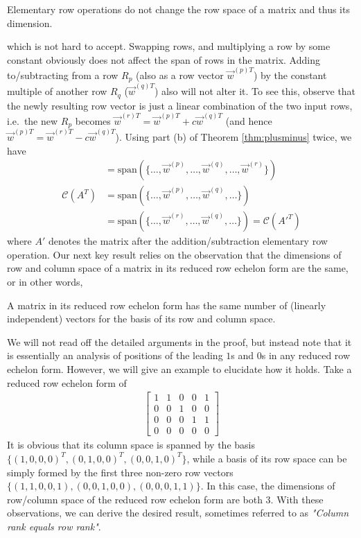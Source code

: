 \begin{proper}
\label{proper:elemrowoprowrank}
Elementary row operations do not change the row space of a matrix and thus its dimension.
\end{proper}
which is not hard to accept. Swapping rows, and multiplying a row by some constant obviously does not affect the span of rows in the matrix. Adding to/subtracting from a row $R_p$ (also as a row vector $\vec{w}^{(p)T}$) by the constant multiple of another row $R_q$ ($\vec{w}^{(q)T}$) also will not alter it. To see this, observe that the newly resulting row vector is just a linear combination of the two input rows, i.e.\ the new $R_p$ becomes $\vec{w}^{(r)T} = \vec{w}^{(p)T} + c\vec{w}^{(q)T}$ (and hence $\vec{w}^{(p)T} = \vec{w}^{(r)T} - c\vec{w}^{(q)T}$). Using part (b) of Theorem \ref{thm:plusminus} twice, we have
\begin{align*}
&= \text{span}(\{\ldots, \vec{w}^{(p)}, \ldots, \vec{w}^{(q)}, \ldots, \vec{w}^{(r)}\}) \\
\mathcal{C}(A^T) &= \text{span}(\{\ldots, \vec{w}^{(p)}, \ldots, \vec{w}^{(q)}, \ldots\}) \\
&= \text{span}(\{\ldots, \vec{w}^{(r)}, \ldots, \vec{w}^{(q)}, \ldots\}) = \mathcal{C}(A'^T)
\end{align*}
where $A'$ denotes the matrix after the addition/subtraction elementary row operation. Our next key result relies on the observation that the dimensions of row and column space of a matrix in its reduced row echelon form are the same, or in other words,
\begin{proper}
\label{proper:rrefcolrowrank}
A matrix in its reduced row echelon form has the same number of (linearly independent) vectors for the basis of its row and column space.
\end{proper}
We will not read off the detailed arguments in the proof, but instead note that it is essentially an analysis of positions of the leading $1$s and $0$s in any reduced row echelon form. However, we will give an example to elucidate how it holds. Take a reduced row echelon form of
\begin{align*}
\begin{bmatrix}
1 & 1 & 0 & 0 & 1 \\
0 & 0 & 1 & 0 & 0 \\
0 & 0 & 0 & 1 & 1 \\
0 & 0 & 0 & 0 & 0 
\end{bmatrix}
\end{align*}
It is obvious that its column space is spanned by the basis $\{(1,0,0,0)^T, \allowbreak (0,1,0,0)^T, (0,0,1,0)^T\}$, while a basis of its row space can be simply formed by the first three non-zero row vectors $\{(1,1,0,0,1), (0,0,1,0,0), (0,0,0,1,1)\}$. In this case, the dimensions of row/column space of the reduced row echelon form are both $3$. With these observations, we can derive the desired result, sometimes referred to as \textit{"Column rank equals row rank"}.
